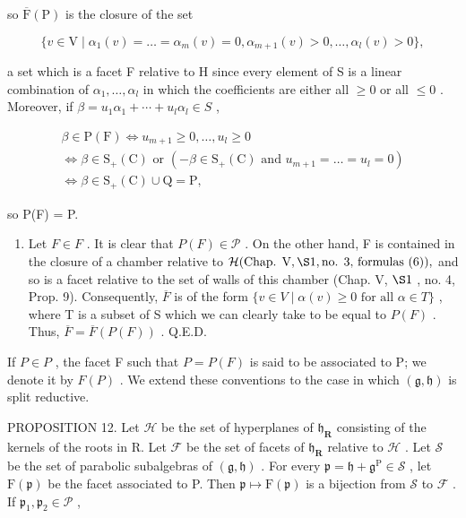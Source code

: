 so \(\overline{\mathrm{F}}(\mathrm{P})\) is the closure of the set

\[
\{v \in \mathrm{V} \mid \alpha_ {1} (v) = \dots = \alpha_ {m} (v) = 0, \alpha_ {m + 1} (v) > 0, \dots , \alpha_ {l} (v) > 0 \},
\]

a set which is a facet F relative to H since every element of S is a linear combination of \(\alpha_{1},\ldots,\alpha_{l}\) in which the coefficients are either all \(\geq0\) or all \(\leq0\) . Moreover, if \(\beta=u_{1}\alpha_{1}+\cdots+u_{l}\alpha_{l}\in S\) ,

\[
\begin{array}{c} \beta \in \mathrm{P} (\mathrm{F}) \Longleftrightarrow u _ {m + 1} \geq 0, \ldots , u _ {l} \geq 0 \\ \Longleftrightarrow \beta \in \mathrm{S} _ {+} (\mathrm{C}) \text {   or   } (- \beta \in \mathrm{S} _ {+} (\mathrm{C}) \text {   and   } u _ {m + 1} = \ldots = u _ {l} = 0) \\ \Longleftrightarrow \beta \in \mathrm{S} _ {+} (\mathrm{C}) \cup \mathrm{Q} = \mathrm{P}, \end{array}
\]

so P(F) = P.

\begin{enumerate}
\def\labelenumi{\alph{enumi})}
\setcounter{enumi}{1}
\tightlist
\item
  Let \(F \in F\) . It is clear that \(P(F) \in \mathcal{P}\) . On the other hand, F is contained in the closure of a chamber relative to \(\mathcal{H}(\text{Chap. V}, \S1, \text{no. 3, formulas (6)}),\) and so is a facet relative to the set of walls of this chamber (Chap. V, \(\S1\) , no. 4, Prop. 9). Consequently, \(\overline{F}\) is of the form \(\{v \in V \mid \alpha(v) \geq 0 \text{ for all } \alpha \in T\}\) , where T is a subset of S which we can clearly take to be equal to \(P(F)\) . Thus, \(\overline{F} = \overline{F}(P(F))\) . Q.E.D.
\end{enumerate}

If \(P \in P\) , the facet F such that \(P = P(F)\) is said to be associated to P; we denote it by \(F(P)\) . We extend these conventions to the case in which \((\mathfrak{g}, \mathfrak{h})\) is split reductive.

PROPOSITION 12. Let \(\mathcal{H}\) be the set of hyperplanes of \(\mathfrak{h}_{\mathbf{R}}\) consisting of the kernels of the roots in R. Let \(\mathcal{F}\) be the set of facets of \(\mathfrak{h}_{\mathbf{R}}\) relative to \(\mathcal{H}\) . Let \(\mathcal{S}\) be the set of parabolic subalgebras of \((\mathfrak{g},\mathfrak{h})\) . For every \(\mathfrak{p} = \mathfrak{h} + \mathfrak{g}^{\mathrm{P}}\in \mathcal{S}\) , let \(\mathrm{F}(\mathfrak{p})\) be the facet associated to P. Then \(\mathfrak{p}\mapsto \mathrm{F}(\mathfrak{p})\) is a bijection from \(\mathcal{S}\) to \(\mathcal{F}\) . If \(\mathfrak{p}_1,\mathfrak{p}_2\in \mathcal{P}\) ,

